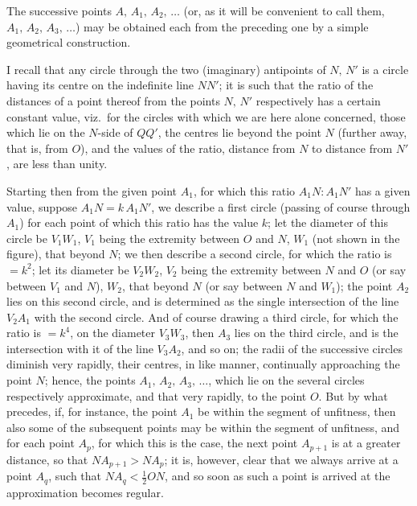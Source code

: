 \documentclass[11pt]{article}
\begin{document}
The successive points $A,\,A_1,\,A_2,\,\ldots$ (or, as it will be convenient to call them,
$A_1,\,A_2,\,A_3,\,\ldots$) may be obtained each from the preceding one by a simple geometrical
construction.

I recall that any circle through the two (imaginary) antipoints of $N,\,N'$ is a
circle having its centre on the indefinite line $NN'$; it is such that the ratio of the
distances of a point thereof from the points $N,\,N'$ respectively has a certain constant
value, viz.\ for the circles with which we are here alone concerned, those which lie
on the $N$-side of $QQ'$, the centres lie beyond the point $N$ (further away, that is, from
$O$), and the values of the ratio, distance from $N$ to distance from $N'$, are less than unity.

Starting then from the given point $A_1$, for which this ratio $A_1 N : A_1 N'$ has a
given value, suppose $A_1 N = k\,A_1 N'$, we describe a first circle (passing of course through
$A_1$) for each point of which this ratio has the value $k$; let the diameter of this
circle be $V_1 W_1$, $V_1$ being the extremity between $O$ and $N$, $W_1$ (not shown in the
figure), that beyond $N$; we then describe a second circle, for which the ratio is
$= k^2$; let its diameter be $V_2 W_2$, $V_2$ being the extremity between $N$ and $O$ (or say
between $V_1$ and $N$), $W_2$, that beyond $N$ (or say between $N$ and $W_1$); the point
$A_2$ lies on this second circle, and is determined as the single intersection of the line
$V_2 A_1$ with the second circle. And of course drawing a third circle, for which the
ratio is $= k^4$, on the diameter $V_3 W_3$, then $A_3$ lies on the third circle, and is the
intersection with it of the line $V_3 A_2$, and so on; the radii of the successive circles
diminish very rapidly, their centres, in like manner, continually approaching the point
$N$; hence, the points $A_1,\,A_2,\,A_3,\,\ldots$, which lie on the several circles respectively
approximate, and that very rapidly, to the point $O$. But by what precedes, if, for
instance, the point $A_1$ be within the segment of unfitness, then also some of the
subsequent points may be within the segment of unfitness, and for each point $A_p$,
for which this is the case, the next point $A_{p+1}$ is at a greater distance, so that
$NA_{p+1} > NA_p$; it is, however, clear that we always arrive at a point $A_q$, such that
$NA_q < \tfrac{1}{2}ON$, and so soon as such a point is arrived at the approximation becomes regular.
\end{document}

